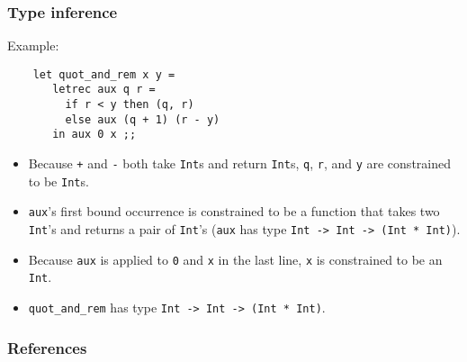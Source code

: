 \documentclass[12pt,red]{beamer}
\begin{document}
\begin{frame}[fragile]
  \frametitle{Type inference}

  Example:
  \vspace*{-0.05in}

  \begin{beamerboxesrounded}[shadow=true]{}
  \begin{center}
    \begin{lstlisting}
    let quot_and_rem x y =
       letrec aux q r =
         if r < y then (q, r)
         else aux (q + 1) (r - y)
       in aux 0 x ;;
    \end{lstlisting}
  \vspace*{-0.1in}
  \end{center}
  \end{beamerboxesrounded}

  \begin{itemize}
  \item Because \lstinline{+} and \lstinline{-} both take
    \lstinline{Int}s and return \lstinline{Int}s, \lstinline{q},
    \lstinline{r}, and \lstinline{y} are constrained to be
    \lstinline{Int}s.

  \item \lstinline{aux}'s first bound occurrence is constrained
    to be a function that takes two \lstinline{Int}'s and returns a
    pair of \lstinline{Int}'s (\lstinline{aux} has type
    \lstinline{Int -> Int -> (Int * Int)}).

  \item Because \lstinline{aux} is applied to \lstinline{0} and
    \lstinline{x} in the last line, \lstinline{x} is constrained to be
    an \lstinline{Int}.

  \item \lstinline{quot_and_rem} has type
    \lstinline{Int -> Int -> (Int * Int)}.
  \end{itemize}
\end{frame}


\begin{frame}[allowframebreaks]
  \frametitle{References}
  \begin{tiny}
    
  \end{tiny}
\end{frame}
\end{document}

